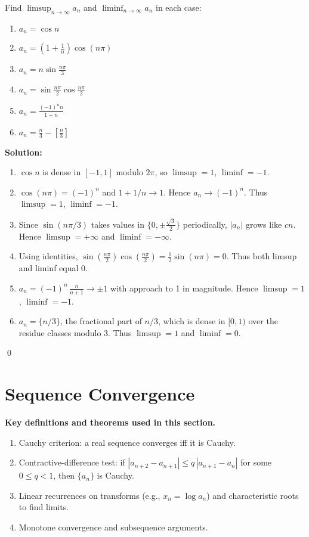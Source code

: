 \begin{problembox}
Find \(\limsup_{n \to \infty} a_n\) and \(\liminf_{n \to \infty} a_n\) in each case:
\begin{enumerate}[label=\alph*)]
\item \(a_n=\cos n\)
\item \(a_n=\left(1 + \frac{1}{n}\right) \cos (n\pi)\)
\item \(a_n=n \sin \frac{n\pi}{3}\)
\item \(a_n=\sin \frac{n\pi}{2} \cos \frac{n\pi}{2}\)
\item \(a_n=\frac{(-1)^n n}{1 + n}\)
\item \(a_n=\frac{n}{3} - \left[\frac{n}{3}\right]\)
\end{enumerate}
\end{problembox}

\noindent\textbf{Solution:}
\begin{enumerate}[label=(\alph*)]
\item \(\cos n\) is dense in \([-1,1]\) modulo \(2\pi\), so \(\limsup=1\), \(\liminf=-1\).
\item \(\cos(n\pi)=(-1)^n\) and \(1+1/n\to 1\). Hence \(a_n\to (-1)^n\). Thus \(\limsup=1\), \(\liminf=-1\).
\item Since \(\sin(n\pi/3)\) takes values in \(\{0,\pm\tfrac{\sqrt{3}}{2}\}\) periodically, \(|a_n|\) grows like \(cn\). Hence \(\limsup=+\infty\) and \(\liminf=-\infty\).
\item Using identities, \(\sin(\tfrac{n\pi}{2})\cos(\tfrac{n\pi}{2})=\tfrac{1}{2}\sin(n\pi)=0\). Thus both limsup and liminf equal 0.
\item \(a_n=(-1)^n\, \tfrac{n}{n+1}\to \pm 1\) with approach to 1 in magnitude. Hence \(\limsup=1\), \(\liminf=-1\).
\item \(a_n=\{n/3\}\), the fractional part of \(n/3\), which is dense in \([0,1)\) over the residue classes modulo 3. Thus \(\limsup=1\) and \(\liminf=0\).
\end{enumerate}\qed
\section{Sequence Convergence}

\noindent\textbf{Key definitions and theorems used in this section.}
\begin{enumerate}
\item Cauchy criterion: a real sequence converges iff it is Cauchy.
\item Contractive-difference test: if \(|a_{n+2}-a_{n+1}|\le q\,|a_{n+1}-a_n|\) for some \(0\le q<1\), then \(\{a_n\}\) is Cauchy.
\item Linear recurrences on transforms (e.g., \(x_n=\log a_n\)) and characteristic roots to find limits.
\item Monotone convergence and subsequence arguments.
\end{enumerate}



